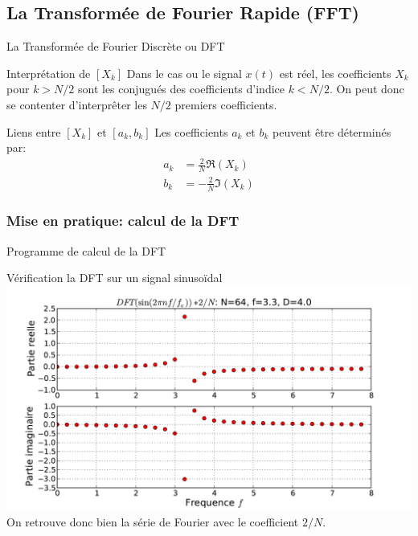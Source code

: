 \documentclass[8pt,a4paper]{beamer}
\begin{document}
  \subsection{La Transformée de Fourier Rapide (FFT)}
  \begin{frame}{La Transformée de Fourier Discrète ou DFT}
  \begin{block}{Interprétation de $[X_k]$ }
  Dans le cas ou le signal $x(t)$ est réel, les coefficients $X_k$ pour $k>N/2$ sont les conjugués des coefficients d'indice $k<N/2$. On peut donc se contenter d'interprêter les $N/2$ premiers coefficients. 
  \end{block}
  \begin{block}{Liens entre $[X_k]$ et $[a_k,b_k]$ }
  Les coefficients $a_k$ et $b_k$ peuvent \^etre déterminés par:
  \begin{align}
  a_k & = \frac{2}{N} \Re(X_k)\nonumber \\  
  b_k & = -\frac{2}{N} \Im(X_k)\nonumber
  \end{align}
  \end{block}
  \end{frame}
  \begin{frame}[containsverbatim]
  \frametitle{Mise en pratique: calcul de la DFT}
\begin{block}{Programme de calcul de la DFT}

\end{block}
\end{frame}

\begin{frame}{Vérification la DFT sur un signal sinusoïdal}
\includegraphics[width=1.\textwidth]{figures/DFT_sinus.pdf} \\
On retrouve donc bien la série de Fourier avec le coefficient $2/N$.
\end{frame}
\end{document}
